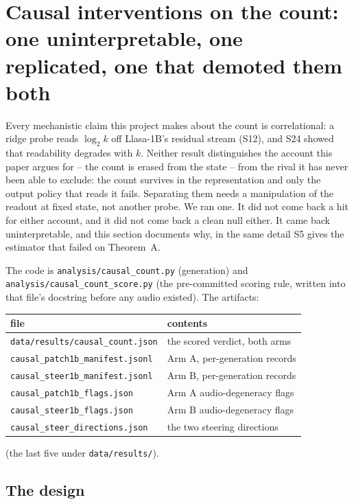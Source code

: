 \documentclass[11pt]{article}
\begin{document}
\section{Causal interventions on the count: one uninterpretable, one replicated, one that demoted them both}
\label{sec:s26}

Every mechanistic claim this project makes about the count is correlational: a
ridge probe reads $\log_2 k$ off Llasa-1B's residual stream (S12), and S24
showed that readability degrades with $k$. Neither result distinguishes the
account this paper argues for -- the count is erased from the state -- from the
rival it has never been able to exclude: the count survives in the
representation and only the output policy that reads it fails. Separating them
needs a manipulation of the readout at fixed state, not another probe. We ran
one. It did not come back a hit for either account, and it did not come back a
clean null either. It came back uninterpretable, and this section documents why,
in the same detail S5 gives the estimator that failed on Theorem~A.

The code is \texttt{analysis/causal\_count.py} (generation) and
\texttt{analysis/causal\_count\_score.py} (the pre-committed scoring rule,
written into that file's docstring before any audio existed). The artifacts:

\begin{center}
\begin{tabular}{@{}ll@{}}
\toprule
file & contents \\
\midrule
\texttt{data/results/causal\_count.json} & the scored verdict, both arms \\
\texttt{causal\_patch1b\_manifest.jsonl} & Arm A, per-generation records \\
\texttt{causal\_steer1b\_manifest.jsonl} & Arm B, per-generation records \\
\texttt{causal\_patch1b\_flags.json} & Arm A audio-degeneracy flags \\
\texttt{causal\_steer1b\_flags.json} & Arm B audio-degeneracy flags \\
\texttt{causal\_steer\_directions.json} & the two steering directions \\
\bottomrule
\end{tabular}
\end{center}

\noindent (the last five under \texttt{data/results/}).

\subsection{The design}
\end{document}
